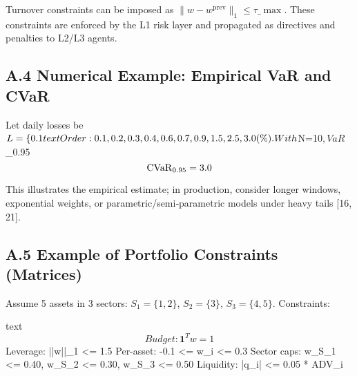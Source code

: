\documentclass[11pt,a4paper]{article}
\begin{document}
Turnover constraints can be imposed as $\|w-w^{\text{prev}}\|_1 \le \tau\_{\max}$. These constraints are enforced by the L1 risk layer and propagated as directives and penalties to L2/L3 agents.

\subsection{A.4 Numerical Example: Empirical VaR and CVaR}

Let daily losses be $L=\{0.1\\%

text
Order: 0.1, 0.2, 0.3, 0.4, 0.6, 0.7, 0.9, 1.5, 2.5, 3.0 (\%).


With $N=10$, VaR$_{0.95}\\%

\begin{equation}
\mathrm{CVaR}_{0.95} = 3.0\\%
\end{equation}

This illustrates the empirical estimate; in production, consider longer windows, exponential weights, or parametric/semi‑parametric models under heavy tails [16, 21].

\subsection{A.5 Example of Portfolio Constraints (Matrices)}

Assume 5 assets in 3 sectors: $S_1=\{1,2\}$, $S_2=\{3\}$, $S_3=\{4,5\}$. Constraints:

text
\begin{equation}
Budget:        \mathbf{1}^T w = 1
\end{equation}
Leverage:      ||w||_1 <= 1.5
Per-asset:     -0.1 <= w_i <= 0.3
Sector caps:   w_{S_1} <= 0.40, w_{S_2} <= 0.30, w_{S_3} <= 0.50
Liquidity:     |q_i| <= 0.05 * ADV_i
\end{document}
